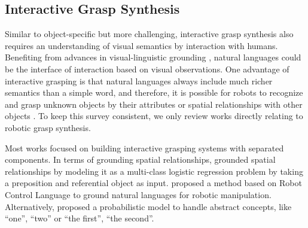 \documentclass[letterpaper,10pt]{article}
\begin{document}
\subsection{Interactive Grasp Synthesis}

Similar to object-specific but more challenging, interactive grasp synthesis also requires an understanding of visual semantics by interaction with humans.
Benefiting from advances in visual-linguistic grounding \cite{nagaraja2016modeling, hu2017modeling, yu2018mattnet, lu2019vilbert, su2019vl, chen2020uniter}, natural languages could be the interface of interaction based on visual observations.
One advantage of interactive grasping is that natural languages always include much richer semantics than a simple word, and therefore, it is possible for robots to recognize and grasp unknown objects by their attributes or spatial relationships with other objects \cite{guadarrama2014open}.
To keep this survey consistent, we only review works directly relating to robotic grasp synthesis.

Most works focused on building interactive grasping systems with separated components.
In terms of grounding spatial relationships, \cite{guadarrama2013grounding} grounded spatial relationships by modeling it as a multi-class logistic regression problem by taking a preposition and referential object as input.
\cite{alomari2017natural} proposed a method based on Robot Control Language \cite{matuszek2013learning} to ground natural languages for robotic manipulation.
Alternatively, \cite{paul2018efficient} proposed a probabilistic model to handle abstract concepts, like ``one'', ``two'' or ``the first'', ``the second''.
\end{document}
